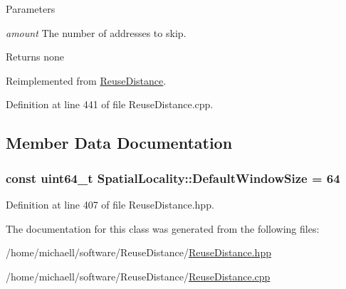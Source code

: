 \begin{DoxyParams}{Parameters}
\item[{\em amount}]The number of addresses to skip.\end{DoxyParams}
\begin{DoxyReturn}{Returns}
none 
\end{DoxyReturn}


Reimplemented from \hyperlink{class_reuse_distance_a0763528236db14a9e0234465e72da3b6}{ReuseDistance}.



Definition at line 441 of file ReuseDistance.cpp.



\subsection{Member Data Documentation}
\hypertarget{class_spatial_locality_a563aa890ea539ae76c942fd1827a3095}{
\subsubsection[{DefaultWindowSize}]{\setlength{\rightskip}{0pt plus 5cm}const uint64\_\-t {\bf SpatialLocality::DefaultWindowSize} = 64}}
\label{class_spatial_locality_a563aa890ea539ae76c942fd1827a3095}


Definition at line 407 of file ReuseDistance.hpp.



The documentation for this class was generated from the following files:\begin{DoxyCompactItemize}
\item 
/home/michaell/software/ReuseDistance/\hyperlink{_reuse_distance_8hpp}{ReuseDistance.hpp}\item 
/home/michaell/software/ReuseDistance/\hyperlink{_reuse_distance_8cpp}{ReuseDistance.cpp}\end{DoxyCompactItemize}

